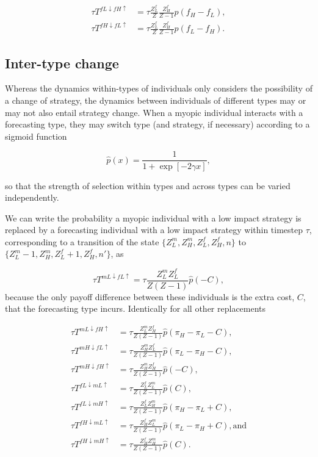 \documentclass{article}
\begin{document}
\begin{align}
\tau T^{fL\downarrow fH\uparrow} &=
        \tau\frac{Z^f_L}{Z}\frac{Z^f_H}{Z-1} p(f_H-f_L), \\
\tau T^{fH\downarrow fL\uparrow} &=
        \tau\frac{Z^f_L}{Z}\frac{Z^f_H}{Z-1} p(f_L-f_H).
\end{align}

\subsection{Inter-type change}

Whereas the dynamics within-types of individuals only considers the possibility of a change of strategy, the dynamics between individuals of different types may or may not also entail strategy change.   
When a myopic individual interacts with a forecasting type, they may switch type (and strategy, if necessary) according to a sigmoid function 

\begin{equation}
    \hat p(x)=\frac{1}{1+\exp{\left[-2\gamma x\right]}},
\end{equation}

so that the strength of selection within types and across types can be varied independently.

We can write the probability a myopic individual with a low impact strategy is replaced by a forecasting individual with a low impact strategy within timestep $\tau$, corresponding to a transition of the state $\{Z^m_L, Z^m_H, Z^f_L, Z^f_H, n\}$ to $\{Z^m_L-1, Z^m_H, Z^f_L+1, Z^f_H, n'\}$, as

\begin{equation}
        \tau T^{mL\downarrow fL\uparrow} =
        \tau\frac{Z^m_L Z^f_L}{Z(Z-1)} \hat p(-C),
\end{equation}
because the only payoff difference between these individuals is the extra cost, $C$, that the forecasting type incurs.
Identically for all other replacements

\begin{align}
\tau T^{mL\downarrow fH\uparrow} &=
        \tau\frac{Z^m_L Z^f_H}{Z(Z-1)} \hat p(\pi_H-\pi_L-C),\\ 
\tau T^{mH\downarrow fL\uparrow} &=
        \tau\frac{Z^m_H Z^f_L}{Z(Z-1)} \hat p(\pi_L-\pi_H-C),\\
\tau T^{mH\downarrow fH\uparrow} &=
        \tau\frac{Z^m_H Z^f_H}{Z(Z-1)} \hat p(-C),\\
\tau T^{fL\downarrow mL\uparrow} &=
        \tau\frac{Z^f_L Z^m_L}{Z(Z-1)} \hat p(C),\\
\tau T^{fL\downarrow mH\uparrow} &=
        \tau\frac{Z^f_L Z^m_H}{Z(Z-1)} \hat p(\pi_H-\pi_L+C),\\
\tau T^{fH\downarrow mL\uparrow} &=
        \tau\frac{Z^f_H Z^m_L}{Z(Z-1)} \hat p(\pi_L-\pi_H+C), \text{and}\\
\tau T^{fH\downarrow mH\uparrow} &=
        \tau\frac{Z^f_H Z^m_H}{Z(Z-1)} \hat p(C).\\
\end{align}
\end{document}
